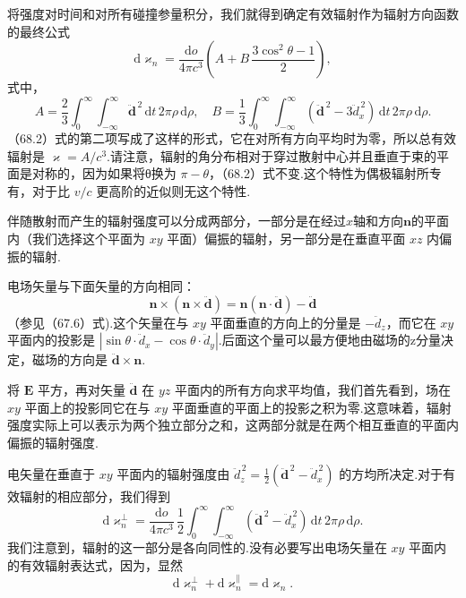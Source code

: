 将强度对时间和对所有碰撞参量积分，我们就得到确定有效辐射作为辐射方向函数的最终公式
\begin{equation}
  \mathrm{d}\varkappa_n=\frac{\mathrm{d}o}{4\pi c^3}\left(A+B\,\frac{3\cos^2\theta-1}{2}\right),
\end{equation}
式中，
\begin{equation}
  A=\frac{2}{3}\int_0^{\infty}\!\!\int_{-\infty}^{\infty}\ddot{\boldsymbol{d}}^{\,2}\,\mathrm{d}t\,2\pi\rho\,\mathrm{d}\rho,\quad
  B=\frac{1}{3}\int_0^{\infty}\!\!\int_{-\infty}^{\infty}(\ddot{\boldsymbol{d}}^{\,2}-3\ddot{d}_x^{\,2})\,\mathrm{d}t\,2\pi\rho\,\mathrm{d}\rho.
\end{equation}
（68.2）式的第二项写成了这样的形式，它在对所有方向平均时为零，所以总有效辐射是 $\varkappa=A/c^3$.请注意，辐射的角分布相对于穿过散射中心并且垂直于束的平面是对称的，因为如果将θ换为 $\pi-\theta$，（68.2）式不变.这个特性为偶极辐射所专有，对于比 $v/c$ 更高阶的近似则无这个特性.

伴随散射而产生的辐射强度可以分成两部分，一部分是在经过$x$轴和方向$\boldsymbol{n}$的平面内（我们选择这个平面为 $xy$ 平面）偏振的辐射，另一部分是在垂直平面 $xz$ 内偏振的辐射.

电场矢量与下面矢量的方向相同：
\begin{equation*}
  \boldsymbol{n}\times(\boldsymbol{n}\times\ddot{\boldsymbol{d}})=\boldsymbol{n}(\boldsymbol{n}\cdot\ddot{\boldsymbol{d}})-\ddot{\boldsymbol{d}}
\end{equation*}
（参见（67.6）式).这个矢量在与 $xy$ 平面垂直的方向上的分量是 $-\ddot{d}_z$，而它在 $xy$ 平面内的投影是 $|\sin\theta\cdot\ddot{d}_x-\cos\theta\cdot\ddot{d}_y|$.后面这个量可以最方便地由磁场的z分量决定，磁场的方向是 $\ddot{\boldsymbol{d}}\times\boldsymbol{n}$.

将 $\boldsymbol{E}$ 平方，再对矢量 $\ddot{\boldsymbol{d}}$ 在 $yz$ 平面内的所有方向求平均值，我们首先看到，场在 $xy$ 平面上的投影同它在与 $xy$ 平面垂直的平面上的投影之积为零.这意味着，辐射强度实际上可以表示为两个独立部分之和，这两部分就是在两个相互垂直的平面内偏振的辐射强度.

电矢量在垂直于 $xy$ 平面内的辐射强度由 $\ddot{d}_z^{\,2}=\frac{1}{2}(\ddot{\boldsymbol{d}}^{\,2}-\ddot{d}_x^{\,2})$ 的方均所决定.对于有效辐射的相应部分，我们得到
\begin{equation}
  \mathrm{d}\varkappa_n^{\perp}=\frac{\mathrm{d}o}{4\pi c^3}\,\frac{1}{2}\int_0^{\infty}\!\!\int_{-\infty}^{\infty}(\ddot{\boldsymbol{d}}^{\,2}-\ddot{d}_x^{\,2})\,\mathrm{d}t\,2\pi\rho\,\mathrm{d}\rho.
\end{equation}
我们注意到，辐射的这一部分是各向同性的.没有必要写出电场矢量在 $xy$ 平面内的有效辐射表达式，因为，显然
\begin{equation*}
  \mathrm{d}\varkappa_n^{\perp}+\mathrm{d}\varkappa_n^{\parallel}=\mathrm{d}\varkappa_n.
\end{equation*}

